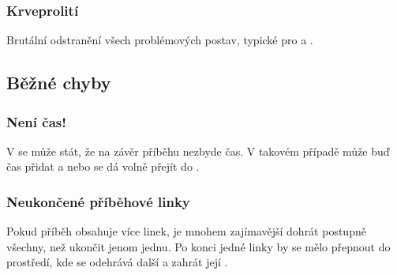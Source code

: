 \subsubsection{ Krveprolití } Brutální odstranění všech problémových postav, typické pro  a . 
 
 
\subsection{ Běžné chyby }  
\subsubsection{ Není čas! } V  se může stát, že na závěr příběhu nezbyde čas. V takovém případě může buď  čas přidat a nebo se dá volně přejít do . 
 
\subsubsection{ Neukončené příběhové linky } Pokud příběh obsahuje více linek, je mnohem zajímavější dohrát postupně všechny, než ukončit jenom jednu. Po konci jedné linky by se mělo přepnout do prostředí, kde se odehrává další a zahrát její . 
 
 
 
